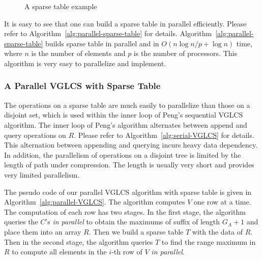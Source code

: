 \begin{figure}[!thb]
  \centering {} 
  \caption{A sparse table example}
  \label{fig:interval-decomposition}
\end{figure}

It is easy to see that one can build a sparse table in parallel
efficiently.  Please refer to
Algorithm~\ref{alg:parallel-sparse-table} for details.
Algorithm~\ref{alg:parallel-sparse-table} builds sparse table in
parallel and in $O(n \log n / p + \log n)$ time, where $n$ is the
number of elements and $p$ is the number of processors.  This
algorithm is very easy to parallelize and implement.



\subsubsection{A Parallel VGLCS with Sparse Table}

The operations on a sparse table are much easily to parallelize than
those on a disjoint set, which is used within the inner loop of Peng's
sequential VGLCS algorithm.  The inner loop of Peng's algorithm
alternates between append and query operations on $R$.  Please refer
to Algorithm~\ref{alg:serial-VGLCS} for details.  This alternation
between appending and querying incurs heavy data dependency.  In
addition, the parallelism of operations on a disjoint tree is limited
by the length of path under compression.  The length is usually very
short and provides very limited parallelism.

The pseudo code of our parallel VGLCS algorithm with sparse table is
given in Algorithm~\ref{alg:parallel-VGLCS}.  The algorithm computes
$V$ one row at a time.  The computation of each row has two stages.
In the first stage, the algorithm queries the $C$'s {\em in parallel}
to obtain the maximums of suffix of length $G_A+1$ and place them
into an array $R$.  Then we build a sparse table $T$ with the data of
$R$.  Then in the second stage, the algorithm queries $T$ to find the
range maximum in $R$ to compute all elements in the $i$-th row of $V$
{\em in parallel}.



